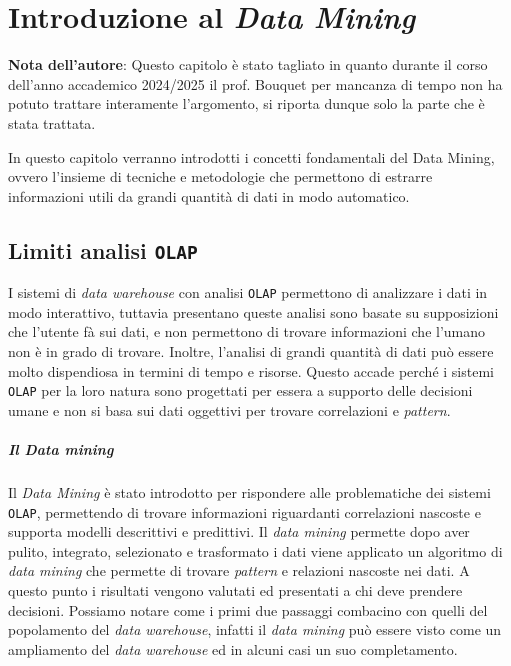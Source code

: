 \chapter{Introduzione al \textit{Data Mining}}
\thispagestyle{stdPage}

{\footnotesize \textbf{Nota dell'autore}: Questo capitolo è stato tagliato in quanto durante il corso dell'anno accademico 2024/2025 il prof. Bouquet per mancanza di tempo non ha potuto trattare interamente l'argomento, si riporta dunque solo la parte che è stata trattata.}

\par

In questo capitolo verranno introdotti i concetti fondamentali del Data Mining, ovvero l'insieme di tecniche e metodologie che permettono di estrarre informazioni utili da grandi quantità di dati in modo automatico. 

\section{Limiti analisi \texttt{OLAP}}
    I sistemi di \textit{data warehouse} con analisi \texttt{OLAP} permettono di analizzare i dati in modo interattivo, tuttavia presentano queste analisi sono basate su supposizioni che l'utente fà sui dati, e non permettono di trovare informazioni che l'umano non è in grado di trovare. Inoltre, l'analisi di grandi quantità di dati può essere molto dispendiosa in termini di tempo e risorse. Questo accade perché i sistemi \texttt{OLAP} per la loro natura sono progettati per essera a supporto delle decisioni umane e non si basa sui dati oggettivi per trovare correlazioni e \textit{pattern}.
    \paragraph{Il \textit{Data mining}}
        Il \textit{Data Mining} è stato introdotto per rispondere alle problematiche dei sistemi \texttt{OLAP}, permettendo di trovare informazioni riguardanti correlazioni nascoste e supporta modelli descrittivi e predittivi. \newline
        Il \textit{data mining} permette dopo aver pulito, integrato, selezionato e trasformato i dati viene applicato un algoritmo di \textit{data mining} che permette di trovare \textit{pattern} e relazioni nascoste nei dati. A questo punto i risultati vengono valutati ed presentati a chi deve prendere decisioni.
        Possiamo notare come i primi due passaggi combacino con quelli del popolamento del \textit{data warehouse}, infatti il \textit{data mining} può essere visto come un ampliamento del \textit{data warehouse} ed in alcuni casi un suo completamento.

